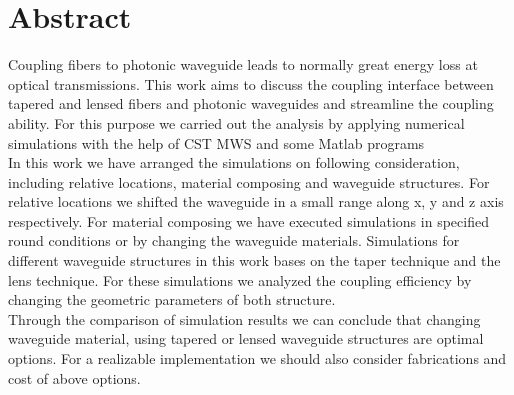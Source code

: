 \chapter*{Abstract}
\label{cha:kurzfassung}
Coupling fibers to photonic waveguide leads to normally great energy loss at optical transmissions. This work aims to discuss the coupling interface between tapered and lensed fibers and photonic waveguides and streamline the coupling ability. For this purpose we carried out the analysis by applying numerical simulations with the help of CST MWS and some Matlab programs \\
In this work we have arranged the simulations on following consideration, including relative locations, material composing and waveguide structures. For relative locations we shifted the waveguide in a small range along x, y and z axis respectively. For material composing we have executed simulations in specified round conditions or by changing the waveguide materials.  Simulations for different waveguide structures in this work bases on the taper technique and the lens technique. For these simulations we analyzed the coupling efficiency by changing the geometric parameters of both structure.\\
Through the comparison of simulation results we can conclude that changing waveguide material, using tapered or lensed waveguide structures are optimal options. For a realizable implementation we should also consider fabrications and cost of above options.
